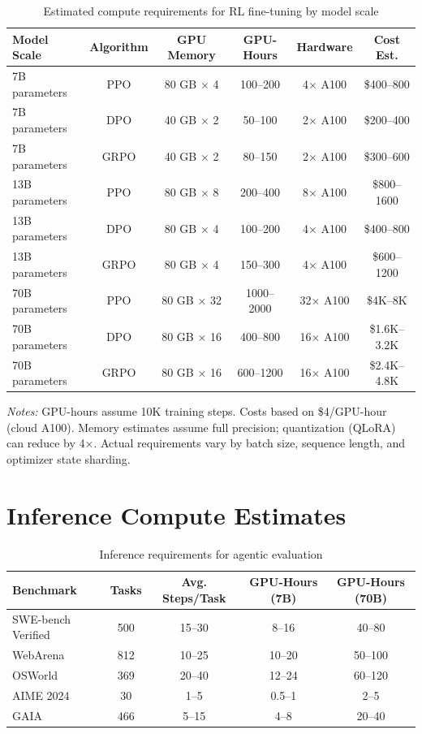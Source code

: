 \documentclass[12pt,a4paper]{report}
\theoremstyle{definition}
\begin{document}
\begin{table}[htbp]
\centering
\caption{Estimated compute requirements for RL fine-tuning by model scale}
\label{tab:compute_training}
\begin{tabular}{@{}lccccc@{}}
\toprule
\textbf{Model Scale} & \textbf{Algorithm} & \textbf{GPU Memory} & \textbf{GPU-Hours} & \textbf{Hardware} & \textbf{Cost Est.} \\
\midrule
7B parameters & PPO & 80 GB $\times$ 4 & 100--200 & 4$\times$ A100 & \$400--800 \\
7B parameters & DPO & 40 GB $\times$ 2 & 50--100 & 2$\times$ A100 & \$200--400 \\
7B parameters & GRPO & 40 GB $\times$ 2 & 80--150 & 2$\times$ A100 & \$300--600 \\
\midrule
13B parameters & PPO & 80 GB $\times$ 8 & 200--400 & 8$\times$ A100 & \$800--1600 \\
13B parameters & DPO & 80 GB $\times$ 4 & 100--200 & 4$\times$ A100 & \$400--800 \\
13B parameters & GRPO & 80 GB $\times$ 4 & 150--300 & 4$\times$ A100 & \$600--1200 \\
\midrule
70B parameters & PPO & 80 GB $\times$ 32 & 1000--2000 & 32$\times$ A100 & \$4K--8K \\
70B parameters & DPO & 80 GB $\times$ 16 & 400--800 & 16$\times$ A100 & \$1.6K--3.2K \\
70B parameters & GRPO & 80 GB $\times$ 16 & 600--1200 & 16$\times$ A100 & \$2.4K--4.8K \\
\bottomrule
\end{tabular}

\vspace{0.3cm}
\small\textit{Notes:} GPU-hours assume 10K training steps. Costs based on \$4/GPU-hour (cloud A100). Memory estimates assume full precision; quantization (QLoRA) can reduce by 4$\times$. Actual requirements vary by batch size, sequence length, and optimizer state sharding.
\end{table}

\section*{Inference Compute Estimates}

\begin{table}[htbp]
\centering
\caption{Inference requirements for agentic evaluation}
\label{tab:compute_inference}
\begin{tabular}{@{}lcccc@{}}
\toprule
\textbf{Benchmark} & \textbf{Tasks} & \textbf{Avg. Steps/Task} & \textbf{GPU-Hours (7B)} & \textbf{GPU-Hours (70B)} \\
\midrule
SWE-bench Verified & 500 & 15--30 & 8--16 & 40--80 \\
WebArena & 812 & 10--25 & 10--20 & 50--100 \\
OSWorld & 369 & 20--40 & 12--24 & 60--120 \\
AIME 2024 & 30 & 1--5 & 0.5--1 & 2--5 \\
GAIA & 466 & 5--15 & 4--8 & 20--40 \\
\bottomrule
\end{tabular}
\end{table}
\end{document}
